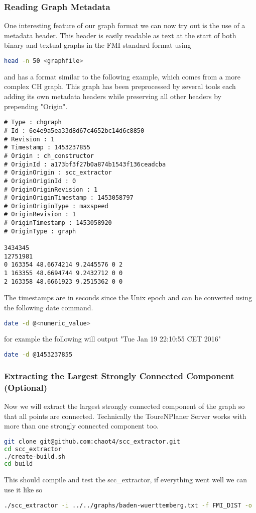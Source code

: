 \documentclass[titlepage,parskip=true]{scrartcl}
\begin{document}
\subsubsection{Reading Graph Metadata}
One interesting feature of our graph format we can now try out is the use of a metadata header.
This header is easily readable as text at the start of both binary and textual graphs in the
FMI standard format using 
\begin{lstlisting}[language=bash]
head -n 50 <graphfile>
\end{lstlisting}
and has a format similar to the following example, which comes from a more
complex CH graph.  This graph has been preprocessed by several tools each
adding its own metadata headers while preserving all other headers by
prepending "Origin".
\begin{verbatim}
# Type : chgraph
# Id : 6e4e9a5ea33d8d67c4652bc14d6c8850
# Revision : 1
# Timestamp : 1453237855
# Origin : ch_constructor
# OriginId : a173bf3f27b0a874b1543f136ceadcba
# OriginOrigin : scc_extractor
# OriginOriginId : 0
# OriginOriginRevision : 1
# OriginOriginTimestamp : 1453058797
# OriginOriginType : maxspeed
# OriginRevision : 1
# OriginTimestamp : 1453058920
# OriginType : graph

3434345
12751981
0 163354 48.6674214 9.2445576 0 2
1 163355 48.6694744 9.2432712 0 0
2 163358 48.6661923 9.2515362 0 0
\end{verbatim}
The timestamps are in seconds since the Unix epoch and can be converted using
the following date command.
\begin{lstlisting}[language=bash]
date -d @<numeric_value>
\end{lstlisting}
for example the following will output "Tue Jan 19 22:10:55 CET 2016"
\begin{lstlisting}[language=bash]
date -d @1453237855
\end{lstlisting}
\subsubsection{Extracting the Largest Strongly Connected Component (Optional)}
Now we will extract the largest strongly connected component of the graph so
that all points are connected. Technically the ToureNPlaner Server works with
more than one strongly connected component too.
\begin{lstlisting}[language=bash]
git clone git@github.com:chaot4/scc_extractor.git
cd scc_extractor
./create-build.sh
cd build
\end{lstlisting}
This should compile and test the scc\_extractor, if everything went well we can
use it like so
\begin{lstlisting}[language=bash]
./scc_extractor -i ../../graphs/baden-wuerttemberg.txt -f FMI_DIST -o ../../graphs/baden-wuerttemberg-scc.txt
\end{lstlisting}
\end{document}
